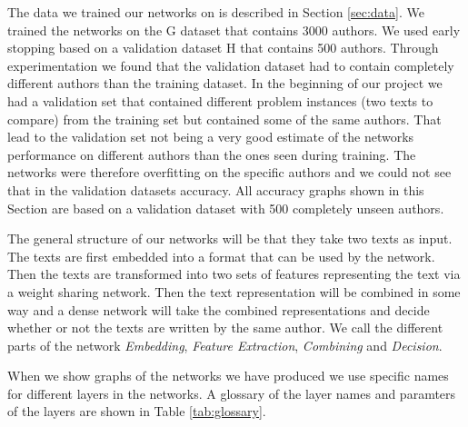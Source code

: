 The data we trained our networks on is described in Section \ref{sec:data}. We
trained the networks on the G dataset that contains 3000 authors. We used early
stopping based on a validation dataset H that contains 500 authors. Through
experimentation we found that the validation dataset had to contain completely
different authors than the training dataset. In the beginning of our project we
had a validation set that contained different problem instances (two texts to
compare) from the training set but contained some of the same authors. That lead
to the validation set not being a very good estimate of the networks performance
on different authors than the ones seen during training. The networks were
therefore overfitting on the specific authors and we could not see that in the
validation datasets accuracy. All accuracy graphs shown in this Section are
based on a validation dataset with 500 completely unseen authors.

The general structure of our networks will be that they take two texts as input.
The texts are first embedded into a format that can be used by the network.
Then the texts are transformed into two sets of features representing the text
via a weight sharing network. Then the text representation will be combined
in some way and a dense network will take the combined representations and
decide whether or not the texts are written by the same author. We call the
different parts of the network \textit{Embedding}, \textit{Feature Extraction},
\textit{Combining} and \textit{Decision}.

When we show graphs of the networks we have produced we use specific names for
different layers in the networks. A glossary of the layer names and paramters of
the layers are shown in Table \ref{tab:glossary}.

